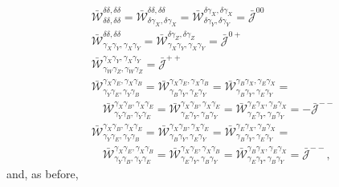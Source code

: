 \documentclass[a4paper,11pt]{article}
\begin{document}
        \begin{align}
          &\bar{\mathcal{W}}^{\delta  \delta  ,\delta  \delta  }_{\delta  \delta  ,\delta  \delta  }=
           \bar{\mathcal{W}}^{\delta  \delta  ,\delta  \delta  }_{\delta  \gamma_X,\delta  \gamma_X}=
           \bar{\mathcal{W}}^{\delta  \gamma_X,\delta  \gamma_X}_{\delta  \gamma_Y,\delta  \gamma_Y}=\bar{\mathcal{J}}^{00}\\
          &\bar{\mathcal{W}}^{\delta  \delta  ,\delta  \delta  }_{\gamma_X\gamma_Y,\gamma_X\gamma_Y}=
           \bar{\mathcal{W}}^{\delta  \gamma_Z,\delta  \gamma_Z}_{\gamma_X\gamma_Y,\gamma_X\gamma_Y}=\bar{\mathcal{J}}^{0+}\\
          &\bar{\mathcal{W}}^{\gamma_X\gamma_Y,\gamma_X\gamma_Y}_{\gamma_W\gamma_Z,\gamma_W\gamma_Z}=\bar{\mathcal{J}}^{++}\\\nonumber
          &\bar{\mathcal{W}}^{\gamma_X\gamma_E,\gamma_X\gamma_B}_{\gamma_Y\gamma_E,\gamma_Y\gamma_B}=
           \bar{\mathcal{W}}^{\gamma_X\gamma_E,\gamma_X\gamma_B}_{\gamma_B\gamma_Y,\gamma_E\gamma_Y}=
           \bar{\mathcal{W}}^{\gamma_B\gamma_X,\gamma_E\gamma_X}_{\gamma_B\gamma_Y,\gamma_E\gamma_Y}=\\
          &\hspace{12pt}
           \bar{\mathcal{W}}^{\gamma_X\gamma_B,\gamma_X\gamma_E}_{\gamma_Y\gamma_B,\gamma_Y\gamma_E}=
           \bar{\mathcal{W}}^{\gamma_X\gamma_B,\gamma_X\gamma_E}_{\gamma_E\gamma_Y,\gamma_B\gamma_Y}=
           \bar{\mathcal{W}}^{\gamma_E\gamma_X,\gamma_B\gamma_X}_{\gamma_E\gamma_Y,\gamma_B\gamma_Y}=-\bar{\mathcal{J}}^{--}\\\nonumber
          &\bar{\mathcal{W}}^{\gamma_X\gamma_B,\gamma_X\gamma_E}_{\gamma_Y\gamma_E,\gamma_Y\gamma_B}=
           \bar{\mathcal{W}}^{\gamma_X\gamma_B,\gamma_X\gamma_E}_{\gamma_B\gamma_Y,\gamma_E\gamma_Y}=
           \bar{\mathcal{W}}^{\gamma_E\gamma_X,\gamma_B\gamma_X}_{\gamma_B\gamma_Y,\gamma_E\gamma_Y}=\\
          &\hspace{12pt}
           \bar{\mathcal{W}}^{\gamma_X\gamma_E,\gamma_X\gamma_B}_{\gamma_Y\gamma_B,\gamma_Y\gamma_E}=
           \bar{\mathcal{W}}^{\gamma_X\gamma_E,\gamma_X\gamma_B}_{\gamma_E\gamma_Y,\gamma_B\gamma_Y}=
           \bar{\mathcal{W}}^{\gamma_B\gamma_X,\gamma_E\gamma_X}_{\gamma_E\gamma_Y,\gamma_B\gamma_Y}=\bar{\mathcal{J}}^{--},
        \end{align}
        and, as before,
\end{document}
